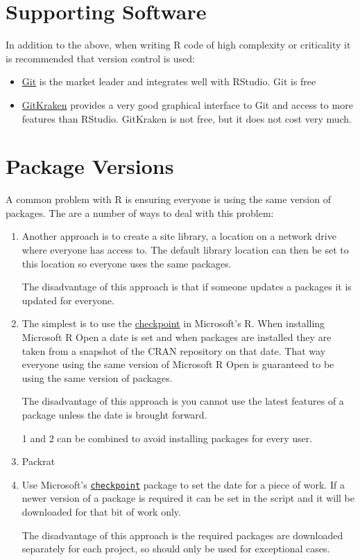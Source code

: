 \documentclass[]{book}
\providecommand{\tightlist}{%
  \setlength{\itemsep}{0pt}\setlength{\parskip}{0pt}}
\theoremstyle{definition}
\theoremstyle{definition}
\theoremstyle{definition}
\theoremstyle{remark}
\begin{document}
\section{Supporting Software}\label{supporting-software}

In addition to the above, when writing R code of high complexity or
criticality it is recommended that version control is used:

\begin{itemize}
\tightlist
\item
  \href{http://gitforwindows.org/}{Git} is the market leader and
  integrates well with RStudio. Git is free
\item
  \href{https://www.gitkraken.com/}{GitKraken} provides a very good
  graphical interface to Git and access to more features than RStudio.
  GitKraken is not free, but it does not cost very much.
\end{itemize}

\section{Package Versions}\label{package-versions}

A common problem with R is ensuring everyone is using the same version
of packages. The are a number of ways to deal with this problem:

\begin{enumerate}
\def\labelenumi{\arabic{enumi}.}
\item
  Another approach is to create a site library, a location on a network
  drive where everyone has access to. The default library location can
  then be set to this location so everyone uses the same packages.

  The disadvantage of this approach is that if someone updates a
  packages it is updated for everyone.
\item
  The simplest is to use the
  \href{https://mran.microsoft.com/documents/rro/reproducibility}{checkpoint}
  in Microsoft's R. When installing Microsoft R Open a date is set and
  when packages are installed they are taken from a snapshot of the CRAN
  repository on that date. That way everyone using the same version of
  Microsoft R Open is guaranteed to be using the same version of
  packages.

  The disadvantage of this approach is you cannot use the latest
  features of a package unless the date is brought forward.

  1 and 2 can be combined to avoid installing packages for every user.
\item
  Packrat
\item
  Use Microsoft's
  \href{https://mran.microsoft.com/documents/rro/reproducibility}{\texttt{checkpoint}}
  package to set the date for a piece of work. If a newer version of a
  package is required it can be set in the script and it will be
  downloaded for that bit of work only.

  The disadvantage of this approach is the required packages are
  downloaded separately for each project, so should only be used for
  exceptional cases.
\end{enumerate}
\end{document}
